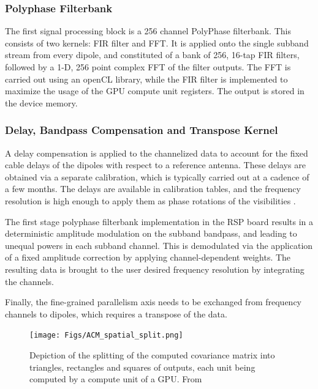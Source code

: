 \documentclass{ws-jai}
\begin{document}

\subsubsection {Polyphase Filterbank}
 The first signal processing block is a
256 channel PolyPhase  filterbank. This consists of two kernels:  FIR filter and
FFT.   It is  applied onto  the  single subband  stream from  every dipole,  and
constituted of a bank  of 256, 16-tap FIR filters, followed by  a 1-D, 256 point
complex FFT  of the  filter outputs.   The FFT  is carried  out using  an openCL
library, while the  FIR filter is implemented  to maximize the usage  of the GPU
compute unit registers. The output is stored in the device memory.\\

\subsubsection {Delay,  Bandpass Compensation and Transpose  Kernel}
 A delay
compensation is applied  to the channelized data to account  for the fixed cable
delays of  the dipoles with  respect to a  reference antenna.  These  delays are
obtained via a separate calibration, which is typically carried out at a cadence
of  a few  months.  The  delays  are available  in calibration  tables, and  the
frequency resolution  is high  enough to  apply them as  phase rotations  of the
visibilities \cite {zatman1998narrow}.

The first stage polyphase filterbank implementation  in the RSP board results in
a deterministic  amplitude modulation  on the subband  bandpass, and  leading to
unequal powers in each subband channel.  This is demodulated via the application
of  a fixed  amplitude correction  by applying  channel-dependent weights.   The
resulting  data  is  brought  to   the  user  desired  frequency  resolution  by
integrating the channels.

Finally, the fine-grained parallelism axis  needs to be exchanged from frequency
channels to dipoles, which requires a transpose of the data.

\begin{figure}[htbp]
\centering
\texttt{[image: Figs/ACM\_spatial\_split.png]}
\caption  {Depiction of  the splitting  of the  computed covariance  matrix into
  triangles, rectangles  and squares of outputs,  each unit being computed  by a
  compute unit of a GPU. From \cite{romein2016comparison}}
\label{fig:acm_spatial_split}
\end{figure}
\end{document}

